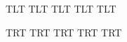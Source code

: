 \documentclass[]{article}
\begin{document}
\textdir TLT
\pardir TLT
\pagedir TLT
\pardir TLT
\mathdir TLT


\textdir TRT
\pardir TRT
\pagedir TRT
\pardir TRT
\mathdir TRT
\end{document}
